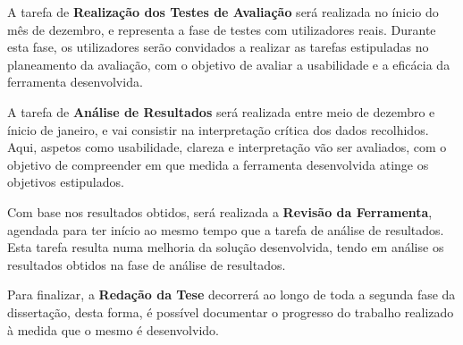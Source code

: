 A tarefa de \textbf{Realização dos Testes de Avaliação} será realizada no ínicio do mês de dezembro, e representa a fase de testes com utilizadores reais. Durante esta fase, os utilizadores serão convidados a realizar as tarefas estipuladas no planeamento da avaliação, com o objetivo de avaliar a usabilidade e a eficácia da ferramenta desenvolvida.

A tarefa de \textbf{Análise de Resultados} será realizada entre meio de dezembro e ínicio de janeiro, e vai consistir na interpretação crítica dos dados recolhidos. Aqui, aspetos como usabilidade, clareza e interpretação vão ser avaliados, com o objetivo de compreender em que medida a ferramenta desenvolvida atinge os objetivos estipulados.

Com base nos resultados obtidos, será realizada a \textbf{Revisão da Ferramenta}, agendada para ter início ao mesmo tempo que a tarefa de análise de resultados. Esta tarefa resulta numa melhoria da solução desenvolvida, tendo em análise os resultados obtidos na fase de análise de resultados.

Para finalizar, a \textbf{Redação da Tese} decorrerá ao longo de toda a segunda fase da dissertação, desta forma, é possível documentar o progresso do trabalho realizado à medida que o mesmo é desenvolvido.
